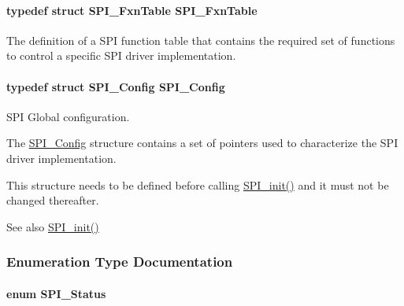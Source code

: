 \paragraph[{S\+P\+I\+\_\+\+Fxn\+Table}]{\setlength{\rightskip}{0pt plus 5cm}typedef struct {\bf S\+P\+I\+\_\+\+Fxn\+Table}  {\bf S\+P\+I\+\_\+\+Fxn\+Table}}\label{_s_p_i_8h_abfe91bed666eb36f3b3fa54f4b9f84bf}


The definition of a S\+P\+I function table that contains the required set of functions to control a specific S\+P\+I driver implementation. 

\paragraph[{S\+P\+I\+\_\+\+Config}]{\setlength{\rightskip}{0pt plus 5cm}typedef struct {\bf S\+P\+I\+\_\+\+Config}  {\bf S\+P\+I\+\_\+\+Config}}\label{_s_p_i_8h_ae19802ec6efc91414e46af9b2435b942}


S\+P\+I Global configuration. 

The \hyperlink{struct_s_p_i___config}{S\+P\+I\+\_\+\+Config} structure contains a set of pointers used to characterize the S\+P\+I driver implementation.

This structure needs to be defined before calling \hyperlink{_s_p_i_8h_afd9b09f58917f0e2d14c61b956eba214}{S\+P\+I\+\_\+init()} and it must not be changed thereafter.

\begin{DoxySeeAlso}{See also}
\hyperlink{_s_p_i_8h_afd9b09f58917f0e2d14c61b956eba214}{S\+P\+I\+\_\+init()} 
\end{DoxySeeAlso}


\subsubsection{Enumeration Type Documentation}
\paragraph[{S\+P\+I\+\_\+\+Status}]{\setlength{\rightskip}{0pt plus 5cm}enum {\bf S\+P\+I\+\_\+\+Status}}\label{_s_p_i_8h_a913c57c335166de9caa54b7eb9ad95fb}


